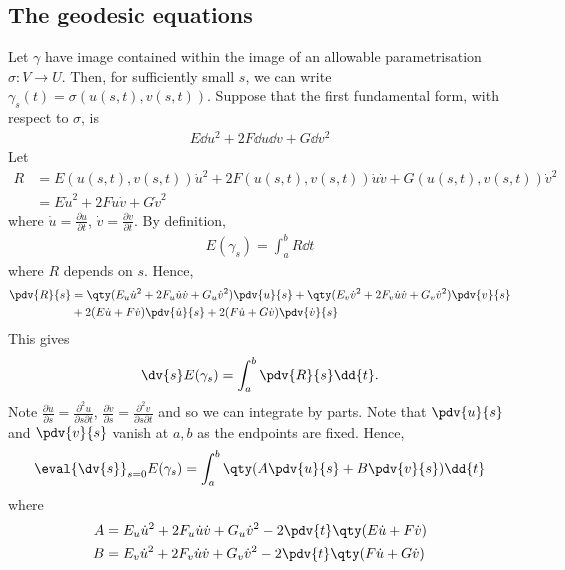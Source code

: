 \subsection{The geodesic equations}
Let $\gamma$ have image contained within the image of an allowable parametrisation $\sigma \colon V \to U$.
Then, for sufficiently small $s$, we can write $\gamma_s(t) = \sigma(u(s,t), v(s,t))$.
Suppose that the first fundamental form, with respect to $\sigma$, is
\begin{align*}
	E \dd{u}^2 + 2F \dd{u} \dd{v} + G \dd{v}^2
\end{align*}
Let
\begin{align*}
	R &= E(u(s, t), v(s, t)) \dot u^2 + 2F(u(s, t), v(s, t)) \dot u \dot v + G(u(s, t), v(s, t)) \dot v^2 \\
	&= E \dot u^2 + 2F \dot u \dot v + G \dot v^2
\end{align*}
where $\dot{u} = \frac{\partial u}{\partial t}$, $\dot{v} = \frac{\partial v}{\partial t}$.
By definition,
\begin{align*}
	E(\gamma_s) = \int_a^b R \dd{t}
\end{align*}
where $R$ depends on $s$.
Hence,
\begin{align*}
	\pdv{R}{s} & = \qty(E_u \dot u^2 + 2F_u \dot u \dot v + G_u \dot v^2) \pdv{u}{s} + \qty(E_v \dot v^2 + 2F_v \dot u \dot v + G_v \dot v^2) \pdv{v}{s} \\
	           & + 2 (E \dot u + F \dot v) \pdv{\dot u}{s} + 2(F \dot u + G \dot v) \pdv{\dot v}{s}
\end{align*}
This gives
\begin{align*}
	\dv{s} E(\gamma_s) = \int_a^b \pdv{R}{s} \dd{t}.
\end{align*}
Note $\frac{\partial \dot{u}}{\partial s} = \frac{\partial^2 u}{\partial s \partial t}$, $\frac{\partial \dot{v}}{\partial s} = \frac{\partial^2 v}{\partial s \partial t}$ and so we can integrate by parts.
Note that $\pdv{u}{s}$ and $\pdv{v}{s}$ vanish at $a,b$ as the endpoints are fixed. 
Hence,
\begin{align*}
	\eval{\dv{s}}_{s=0} E(\gamma_s) = \int_a^b \qty(A \pdv{u}{s} + B \pdv{v}{s}) \dd{t}
\end{align*}
where
\begin{align*}
	A & = E_u \dot u^2 + 2F_u \dot u \dot v + G_u \dot v^2 - 2 \pdv{t} \qty(E \dot u + F \dot v) \\
	B & = E_v \dot u^2 + 2F_v \dot u \dot v + G_v \dot v^2 - 2 \pdv{t} \qty(F \dot u + G \dot v)
\end{align*}

